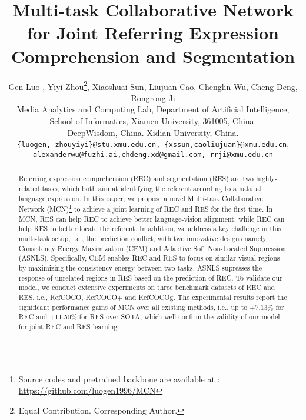 \documentclass[10pt,twocolumn,letterpaper]{article}
\begin{document}
\title{Multi-task Collaborative  Network for Joint  Referring Expression Comprehension and Segmentation}

\author{
	Gen Luo ,
	Yiyi Zhou\thanks{Equal Contribution.  Corresponding Author.},
	Xiaoshuai Sun,
	Liujuan Cao,
	Chenglin Wu,
	Cheng Deng,
	Rongrong Ji
	 \\
	Media Analytics and Computing Lab, Department of Artificial Intelligence,\\
	School of Informatics, Xiamen University, 361005, China.\\
	DeepWisdom, China.
	Xidian University, China.
	   \\	
	{\tt\small \{luogen, zhouyiyi\}@stu.xmu.edu.cn, \{xssun,caoliujuan\}@xmu.edu.cn},\\
	{\tt\small alexanderwu@fuzhi.ai,chdeng.xd@gmail.com, rrji@xmu.edu.cn}\\
}

\maketitle
\thispagestyle{empty}

\begin{abstract}
	Referring expression comprehension (REC) and segmentation (RES) are two highly-related tasks, which both aim at identifying the referent according to a natural language expression. 
	In this paper, we propose a novel Multi-task Collaborative Network (MCN)\footnote{Source codes and pretrained backbone are available at : \url{https://github.com/luogen1996/MCN}} to achieve a joint learning of REC and RES for the first time.
	In MCN,  RES can help REC to achieve better language-vision alignment, while REC can help RES to  better locate the referent.
	In addition, we address a key challenge in this  multi-task setup, i.e., the prediction conflict, with two innovative designs namely,   Consistency Energy Maximization (CEM) and Adaptive Soft Non-Located Suppression (ASNLS). 
	Specifically, CEM enables  REC and RES  to focus  on similar visual regions by maximizing the consistency energy between  two tasks.  ASNLS  supresses the response of unrelated regions in RES based on the prediction of REC. 
	To validate our model, we conduct extensive experiments on three benchmark datasets of REC and RES, i.e., RefCOCO, RefCOCO+ and RefCOCOg. 
	The experimental results report   the significant  performance gains of MCN over all  existing methods, i.e., up to +7.13\% for REC and +11.50\% for RES over SOTA, which  well confirm the validity of our model  for  joint REC and RES learning.
\end{abstract}
\end{document}
